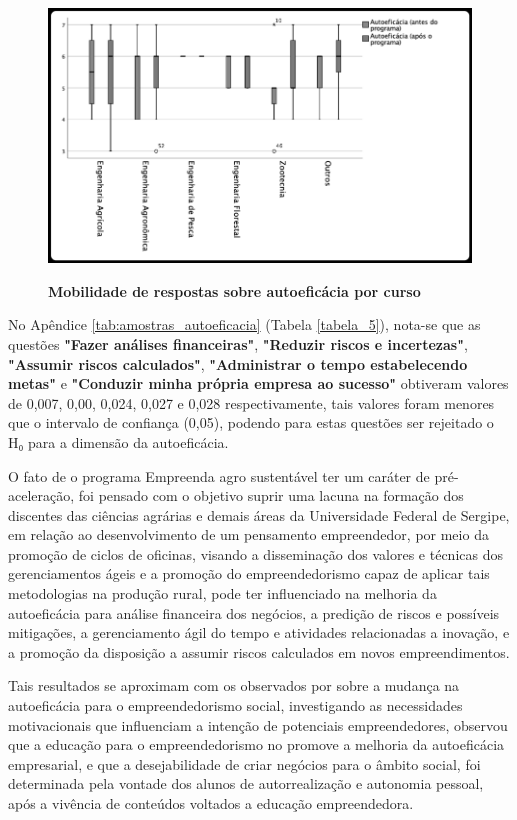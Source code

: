 \begin{figure}[H]
\centering
\caption{\textbf{Mobilidade de respostas sobre autoeficácia por curso}}
\includegraphics[scale=0.4]{Imagens/boxplot_autoeficacia.png}
\label{figura_34}
\end{figure}


No Apêndice \ref{tab:amostras_autoeficacia} (Tabela \ref{tabela_5}), nota-se que as questões \textbf{"Fazer análises financeiras"}, \textbf{"Reduzir riscos e incertezas"}, \textbf{"Assumir riscos calculados"}, \textbf{"Administrar o tempo estabelecendo metas"} e \textbf{"Conduzir minha própria empresa ao sucesso"} obtiveram valores de 0,007, 0,00, 0,024, 0,027 e 0,028 respectivamente, tais valores foram menores que o intervalo de confiança (0,05), podendo para estas questões ser rejeitado o H₀ para a dimensão da autoeficácia.

O fato de o programa Empreenda agro sustentável ter um caráter de pré-aceleração, foi pensado com o objetivo suprir uma lacuna na formação dos discentes das ciências agrárias e demais áreas da Universidade Federal de Sergipe, em relação ao desenvolvimento de um pensamento empreendedor, por meio da promoção de ciclos de oficinas, visando a disseminação dos valores e técnicas dos gerenciamentos ágeis e a promoção do empreendedorismo capaz de aplicar tais metodologias na produção rural, pode ter influenciado na melhoria da autoeficácia para análise financeira dos negócios, a predição de riscos e possíveis mitigações, a gerenciamento ágil do tempo e atividades relacionadas a inovação, e a promoção da disposição a assumir riscos calculados em novos empreendimentos.

Tais resultados se aproximam com os observados por  sobre a mudança na autoeficácia para o empreendedorismo social, investigando as necessidades motivacionais que influenciam a intenção de potenciais empreendedores, observou que a educação para o empreendedorismo no promove a melhoria da autoeficácia empresarial, e que a desejabilidade de criar negócios para o âmbito social, foi determinada pela vontade dos alunos de autorrealização e autonomia pessoal, após a vivência de conteúdos voltados a educação empreendedora.

